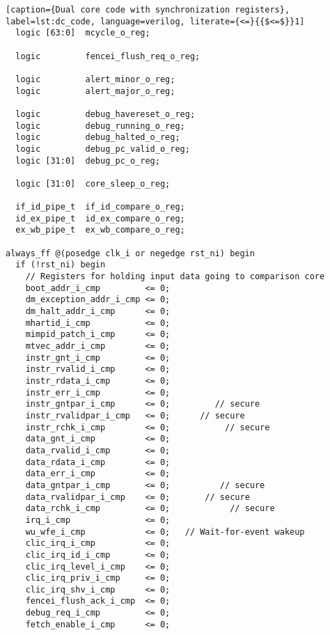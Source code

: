 \begin{lstlisting}[caption={Dual core code with synchronization registers}, label=lst:dc_code, language=verilog, literate={<=}{{$<=$}}1]
  logic [63:0]  mcycle_o_reg;  

  logic         fencei_flush_req_o_reg;  

  logic         alert_minor_o_reg;       
  logic         alert_major_o_reg;

  logic         debug_havereset_o_reg;   
  logic         debug_running_o_reg;     
  logic         debug_halted_o_reg;      
  logic         debug_pc_valid_o_reg;    
  logic [31:0]  debug_pc_o_reg;       

  logic [31:0]  core_sleep_o_reg;   

  if_id_pipe_t  if_id_compare_o_reg;     
  id_ex_pipe_t  id_ex_compare_o_reg;    
  ex_wb_pipe_t  ex_wb_compare_o_reg;     

always_ff @(posedge clk_i or negedge rst_ni) begin
  if (!rst_ni) begin 
    // Registers for holding input data going to comparison core
    boot_addr_i_cmp         <= 0;
    dm_exception_addr_i_cmp <= 0;
    dm_halt_addr_i_cmp      <= 0;
    mhartid_i_cmp           <= 0;
    mimpid_patch_i_cmp      <= 0;
    mtvec_addr_i_cmp        <= 0;
    instr_gnt_i_cmp         <= 0;
    instr_rvalid_i_cmp      <= 0;
    instr_rdata_i_cmp       <= 0;
    instr_err_i_cmp         <= 0;
    instr_gntpar_i_cmp      <= 0;         // secure
    instr_rvalidpar_i_cmp   <= 0;      // secure
    instr_rchk_i_cmp        <= 0;           // secure
    data_gnt_i_cmp          <= 0;
    data_rvalid_i_cmp       <= 0;
    data_rdata_i_cmp        <= 0;
    data_err_i_cmp          <= 0;
    data_gntpar_i_cmp       <= 0;          // secure
    data_rvalidpar_i_cmp    <= 0;       // secure
    data_rchk_i_cmp         <= 0;            // secure
    irq_i_cmp               <= 0;
    wu_wfe_i_cmp            <= 0;   // Wait-for-event wakeup
    clic_irq_i_cmp          <= 0;
    clic_irq_id_i_cmp       <= 0;
    clic_irq_level_i_cmp    <= 0; 
    clic_irq_priv_i_cmp     <= 0;
    clic_irq_shv_i_cmp      <= 0;
    fencei_flush_ack_i_cmp  <= 0;
    debug_req_i_cmp         <= 0;
    fetch_enable_i_cmp      <= 0;


\end{lstlisting}
